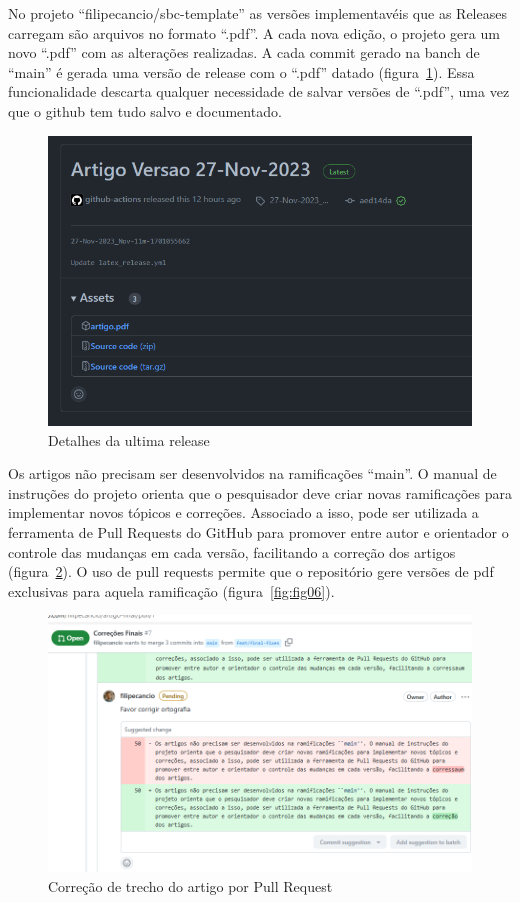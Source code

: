 No projeto ``filipecancio/sbc-template'' as versões implementavéis que as Releases carregam são arquivos no formato ``.pdf''. A cada nova edição, o projeto gera um novo ``.pdf'' com as alterações realizadas. A cada commit gerado na banch de ``main'' é gerada uma versão de release com o ``.pdf'' datado (figura~\ref{fig:fig04}). Essa funcionalidade descarta qualquer necessidade de salvar versões de ``.pdf'', uma vez que o github tem tudo salvo e documentado.
\begin{figure}[H]
	\centering
	\includegraphics[width=.6\textwidth]{./images/fig04.png}
	\caption{Detalhes da ultima release}
	\label{fig:fig04}
\end{figure}

Os artigos não precisam ser desenvolvidos na ramificações ``main''. O manual de instruções do projeto orienta que o pesquisador deve criar novas ramificações para implementar novos tópicos e correções. Associado a isso, pode ser utilizada a ferramenta de Pull Requests do GitHub para promover entre autor e orientador o controle das mudanças em cada versão, facilitando a correção dos artigos (figura~\ref{fig:fig05}). O uso de pull requests permite que o repositório gere versões de pdf exclusivas para aquela ramificação (figura~\ref{fig:fig06}).

\begin{figure}[H]
	\centering
	\includegraphics[width=.6\textwidth]{./images/fig05.png}
	\caption{Correção de trecho do artigo por Pull Request}
	\label{fig:fig05}
\end{figure}


